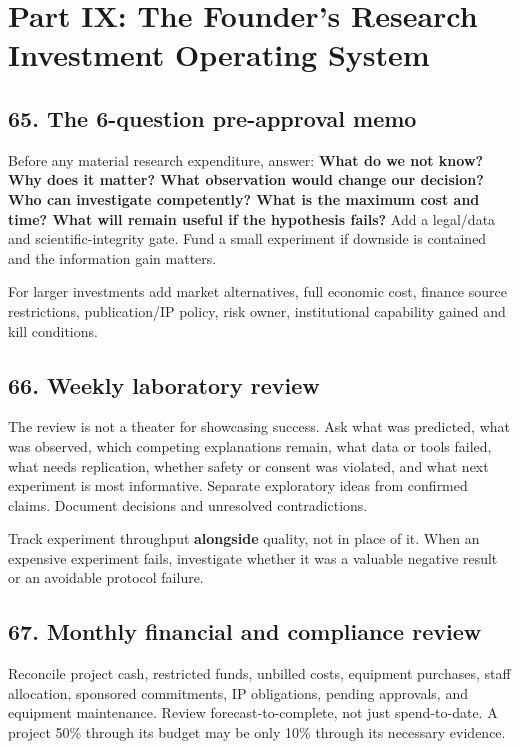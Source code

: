 \section{Part IX: The Founder's Research Investment Operating System}

\subsection{65. The 6-question pre-approval memo}

Before any material research expenditure, answer: \textbf{What do we not know? Why does it matter? What observation would change our decision? Who can investigate competently? What is the maximum cost and time? What will remain useful if the hypothesis fails?} Add a legal/data and scientific-integrity gate. Fund a small experiment if downside is contained and the information gain matters.

For larger investments add market alternatives, full economic cost, finance source restrictions, publication/IP policy, risk owner, institutional capability gained and kill conditions.

\subsection{66. Weekly laboratory review}

The review is not a theater for showcasing success. Ask what was predicted, what was observed, which competing explanations remain, what data or tools failed, what needs replication, whether safety or consent was violated, and what next experiment is most informative. Separate exploratory ideas from confirmed claims. Document decisions and unresolved contradictions.

Track experiment throughput \textbf{alongside} quality, not in place of it. When an expensive experiment fails, investigate whether it was a valuable negative result or an avoidable protocol failure.

\subsection{67. Monthly financial and compliance review}

Reconcile project cash, restricted funds, unbilled costs, equipment purchases, staff allocation, sponsored commitments, IP obligations, pending approvals, and equipment maintenance. Review forecast-to-complete, not just spend-to-date. A project 50\% through its budget may be only 10\% through its necessary evidence.

